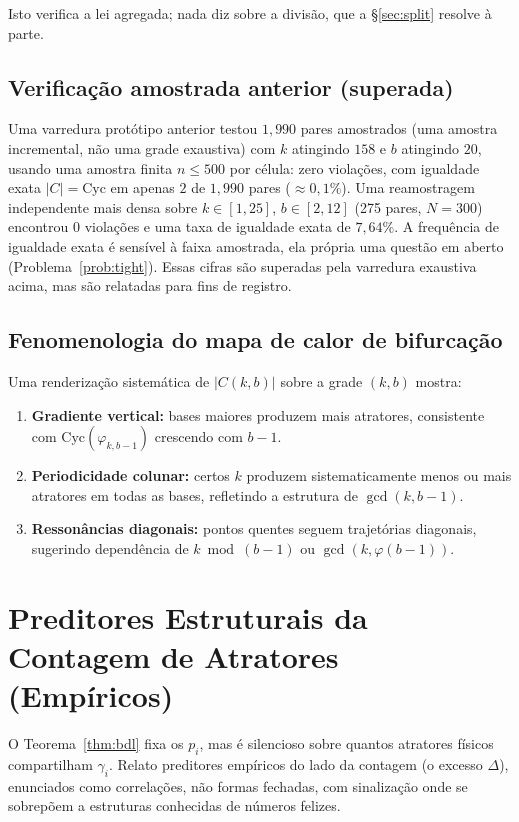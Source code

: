 \documentclass[11pt]{article}
\theoremstyle{definition}
\theoremstyle{remark}
\newcommand{\Cyc}{\mathrm{Cyc}}
\begin{document}
Isto verifica a lei agregada; nada diz sobre a divisão, que a \S\ref{sec:split} resolve à parte.

\subsection{Verificação amostrada anterior (superada)}

Uma varredura protótipo anterior testou $1{,}990$ pares amostrados (uma amostra incremental, não uma grade exaustiva) com $k$ atingindo $158$ e $b$ atingindo $20$, usando uma amostra finita $n \le 500$ por célula: zero violações, com igualdade exata $|C| = \Cyc$ em apenas $2$ de $1{,}990$ pares ($\approx 0{,}1\%$). Uma reamostragem independente mais densa sobre $k \in [1,25]$, $b \in [2,12]$ (275 pares, $N = 300$) encontrou 0 violações e uma taxa de igualdade exata de $7{,}64\%$. A frequência de igualdade exata é sensível à faixa amostrada, ela própria uma questão em aberto (Problema~\ref{prob:tight}). Essas cifras são superadas pela varredura exaustiva acima, mas são relatadas para fins de registro.

\subsection{Fenomenologia do mapa de calor de bifurcação}

Uma renderização sistemática de $|C(k,b)|$ sobre a grade $(k,b)$ mostra:
\begin{enumerate}
\item \textbf{Gradiente vertical:} bases maiores produzem mais atratores, consistente com $\Cyc(\varphi_{k,b-1})$ crescendo com $b-1$.
\item \textbf{Periodicidade colunar:} certos $k$ produzem sistematicamente menos ou mais atratores em todas as bases, refletindo a estrutura de $\gcd(k, b-1)$.
\item \textbf{Ressonâncias diagonais:} pontos quentes seguem trajetórias diagonais, sugerindo dependência de $k \bmod (b-1)$ ou $\gcd(k, \varphi(b-1))$.
\end{enumerate}

\section{Preditores Estruturais da Contagem de Atratores (Empíricos)}\label{sec:predictors}

O Teorema~\ref{thm:bdl} fixa os $p_i$, mas é silencioso sobre quantos atratores físicos compartilham $\gamma_i$. Relato preditores empíricos do lado da contagem (o excesso $\Delta$), enunciados como correlações, não formas fechadas, com sinalização onde se sobrepõem a estruturas conhecidas de números felizes.
\end{document}
